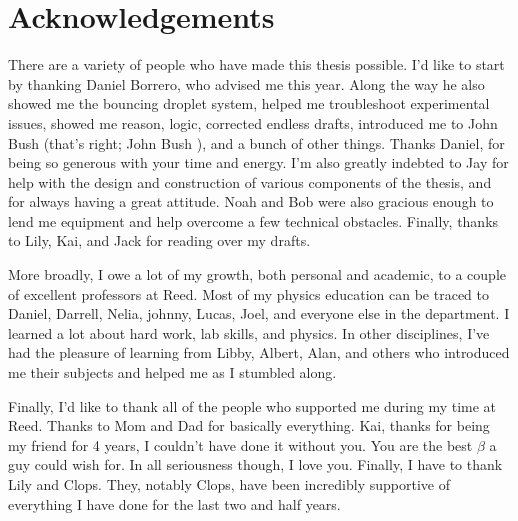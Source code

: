     \chapter*{Acknowledgements}
	There are a variety of people who have made this thesis possible. I'd like to start by thanking Daniel Borrero, who advised me this year. Along the way he also showed me the bouncing droplet system, helped me troubleshoot experimental issues, showed me reason, logic, corrected endless drafts, introduced me to John Bush (that's right; John Bush ), and a bunch of other things. Thanks Daniel, for being so generous with your time and energy. I'm also greatly indebted to Jay for help with the design and construction of various components of the thesis, and for always having a great attitude. Noah and Bob were also gracious enough to lend me equipment and help overcome a few technical obstacles. Finally, thanks to Lily, Kai, and Jack for reading over my drafts.
	
	More broadly, I owe a lot of my growth, both personal and academic, to a couple of excellent professors at Reed. Most of my physics education can be traced to Daniel, Darrell, Nelia, johnny, Lucas, Joel, and everyone else in the department. I learned a lot about hard work, lab skills, and physics. In other disciplines, I've had the pleasure of learning from Libby, Albert, Alan, and others who introduced me their subjects and helped me as I stumbled along. 
	
	Finally, I'd like to thank all of the people who supported me during my time at Reed. Thanks to Mom and Dad for basically everything. Kai, thanks for being my friend for 4 years, I couldn't have done it without you. You are the best $\beta$ a guy could wish for. In all seriousness though, I love you. Finally, I have to thank Lily and Clops. They, notably Clops, have been incredibly supportive of everything I have done for the last two and half years. 

	
	